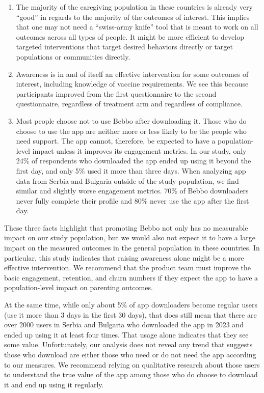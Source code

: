 \documentclass{article}
\begin{document}
\begin{enumerate}
\item The majority of the caregiving population in these countries is already very “good” in regards to the majority of the outcomes of interest. This implies that one may not need a ``swiss-army knife'' tool that is meant to work on all outcomes across all types of people. It might be more efficient to develop targeted interventions that target desired behaviors directly or target populations or communities directly.
\item Awareness is in and of itself an effective intervention for some outcomes of interest, including knowledge of vaccine requirements. We see this because participants improved from the first questionnaire to the second questionnaire, regardless of treatment arm and regardless of compliance.
\item Most people choose not to use Bebbo after downloading it. Those who do choose to use the app are neither more or less likely to be the people who need support. The app cannot, therefore, be expected to have a population-level impact unless it improves its engagement metrics. In our study, only 24\% of respondents who downloaded the app ended up using it beyond the first day, and only 5\% used it more than three days. When analyzing app data from Serbia and Bulgaria outside of the study population, we find similar and slightly worse engagement metrics. 70\% of Bebbo downloaders never fully complete their profile and 80\% never use the app after the first day.

\end{enumerate}

These three facts highlight that promoting Bebbo not only has no measurable impact on our study population, but we would also not expect it to have a large impact on the measured outcomes in the general population in these countries. In particular, this study indicates that raising awareness alone might be a more effective intervention. We recommend that the product team must improve the basic engagement, retention, and churn numbers if they expect the app to have a population-level impact on parenting outcomes.

At the same time, while only about 5\% of app downloaders become regular users (use it more than 3 days in the first 30 days), that does still mean that there are over 2000 users in Serbia and Bulgaria who downloaded the app in 2023 and ended up using it at least four times. That usage alone indicates that they see some value. Unfortunately, our analysis does not reveal any trend that suggests those who download are either those who need or do not need the app according to our measures. We recommend relying on qualitative research about those users to understand the true value of the app among those who do choose to download it and end up using it regularly.
\end{document}
